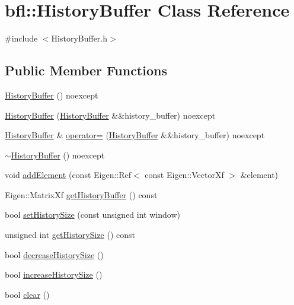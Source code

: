 \hypertarget{classbfl_1_1HistoryBuffer}{}\section{bfl\+:\+:History\+Buffer Class Reference}
\label{classbfl_1_1HistoryBuffer}


{\ttfamily \#include $<$History\+Buffer.\+h$>$}

\subsection*{Public Member Functions}
\begin{DoxyCompactItemize}
\item 
\mbox{\hyperlink{classbfl_1_1HistoryBuffer_a0b0c850ed4a50eeb7eb3d88e10937c1b}{History\+Buffer}} () noexcept
\item 
\mbox{\hyperlink{classbfl_1_1HistoryBuffer_ab88b9511d782060c1b3b0952f608cb08}{History\+Buffer}} (\mbox{\hyperlink{classbfl_1_1HistoryBuffer}{History\+Buffer}} \&\&history\+\_\+buffer) noexcept
\item 
\mbox{\hyperlink{classbfl_1_1HistoryBuffer}{History\+Buffer}} \& \mbox{\hyperlink{classbfl_1_1HistoryBuffer_a77a0d57c5413a374bf21d51693a81715}{operator=}} (\mbox{\hyperlink{classbfl_1_1HistoryBuffer}{History\+Buffer}} \&\&history\+\_\+buffer) noexcept
\item 
\mbox{\hyperlink{classbfl_1_1HistoryBuffer_af61bc43a22241a71223dbc1223480d90}{$\sim$\+History\+Buffer}} () noexcept
\item 
void \mbox{\hyperlink{classbfl_1_1HistoryBuffer_addc58ae2565d761c670e43eab39e0b46}{add\+Element}} (const Eigen\+::\+Ref$<$ const Eigen\+::\+Vector\+Xf $>$ \&element)
\item 
Eigen\+::\+Matrix\+Xf \mbox{\hyperlink{classbfl_1_1HistoryBuffer_a1cd85c51261b387cdb2247a19d6624e0}{get\+History\+Buffer}} () const
\item 
bool \mbox{\hyperlink{classbfl_1_1HistoryBuffer_a34bc31abe55f9d43575919a15a1f90c3}{set\+History\+Size}} (const unsigned int window)
\item 
unsigned int \mbox{\hyperlink{classbfl_1_1HistoryBuffer_a0fef292d6e577b8f2f7d2035927edddb}{get\+History\+Size}} () const
\item 
bool \mbox{\hyperlink{classbfl_1_1HistoryBuffer_a3113fb73683eb5001e7fef0c6d3806cb}{decrease\+History\+Size}} ()
\item 
bool \mbox{\hyperlink{classbfl_1_1HistoryBuffer_a495d4786a46ffe6da00179f412d44f93}{increase\+History\+Size}} ()
\item 
bool \mbox{\hyperlink{classbfl_1_1HistoryBuffer_ad9d3d44d796dccc5adb22be9594618c8}{clear}} ()
\end{DoxyCompactItemize}
